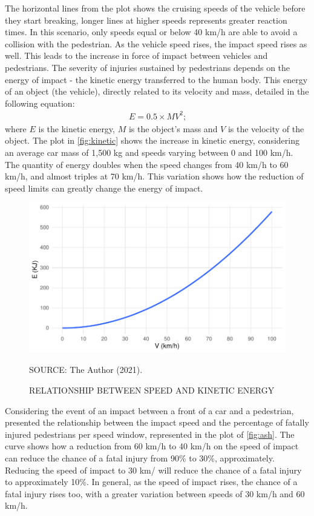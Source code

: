 The horizontal lines from the plot shows the cruising speeds of the vehicle before they start breaking, longer lines at higher speeds represents greater reaction times. In this scenario, only speeds equal or below 40 km/h are able to avoid a collision with the pedestrian. As the vehicle speed rises, the impact speed rises as well. This leads to the increase in force of impact between vehicles and pedestrians. The severity of injuries sustained by pedestrians depends on the energy of impact - the kinetic energy transferred to the human body. This energy of an object (the vehicle), directly related to its velocity and mass, detailed in the following equation: \begin{align}
    E = 0.5 \times MV^2 \mbox{;}
    \label{eq:energy}
\end{align} where $E$ is the kinetic energy, $M$ is the object's mass and $V$ is the velocity of the object. The plot in \autoref{fig:kinetic} shows the increase in kinetic energy, considering an average car mass of 1,500 kg \cite{Zervas2008} and speeds varying between 0 and 100 km/h. The quantity of energy doubles when the speed changes from 40 km/h to 60 km/h, and almost triples at 70 km/h. This variation shows how the reduction of speed limits can greatly change the energy of impact.

\begin{figure}[!htbp]
    \centering\footnotesize
    \captionsetup{font=footnotesize}
    \caption{RELATIONSHIP BETWEEN SPEED AND KINETIC ENERGY}
    \includegraphics{fig/kinetic.pdf}
    \label{fig:kinetic}
    \par SOURCE: The Author (2021).
\end{figure}

Considering the event of an impact between a front of a car and a pedestrian, \textcite{Ashton1980} presented the relationship between the impact speed and the percentage of fatally injured pedestrians per speed window, represented in the plot of \autoref{fig:ash}. The curve shows how a reduction from 60 km/h to 40 km/h on the speed of impact can reduce the chance of a fatal injury from 90\% to 30\%, approximately. Reducing the speed of impact to 30 km/ will reduce the chance of a fatal injury to approximately 10\%. In general, as the speed of impact rises, the chance of a fatal injury rises too, with a greater variation between speeds of 30 km/h and 60 km/h. 


